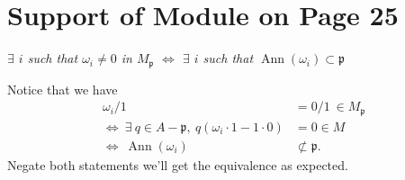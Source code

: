 
\section{Support of Module on Page 25}

\textit{$\exists$ $i$ such that $\omega_i\neq 0$ in $M_{\mathfrak p}$ $\Leftrightarrow$ $\exists$ $i$ such that $\operatorname{Ann}(\omega_i)\subset \mathfrak p$}

Notice that we have \begin{align*}
    \omega_i/1 &= 0/1 ~\in M_{\mathfrak p} \\
    \Leftrightarrow~ \exists~ q\in A-\mathfrak p,~ q(\omega_i\cdot 1-1\cdot 0) &=0\in M \\
    \Leftrightarrow~ \operatorname{Ann}(\omega_i) &\not\subset \mathfrak p.
\end{align*}
Negate both statements we'll get the equivalence as expected.